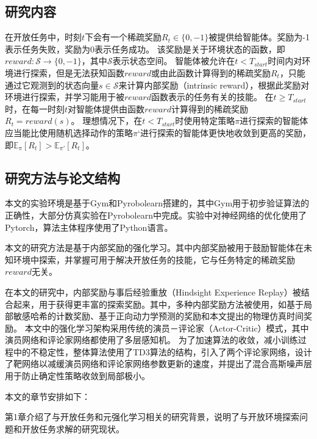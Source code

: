         \subsection{研究内容}
        在开放任务中，时刻$t$下会有一个稀疏奖励$R_t\in\{0,-1\}$被提供给智能体。奖励为-1表示任务失败，奖励为0表示任务成功。
        该奖励是关于环境状态的函数，即$reward:\mathcal S\to\{0,-1\}$，其中$\mathcal S$表示状态空间。
        智能体被允许在$t< T_{start}$时间内对环境进行探索，但是无法获知函数$reward$或由此函数计算得到的稀疏奖励$R_t$，只能通过它观测到的状态向量$s\in\mathcal S$来计算内部奖励（intrinsic reward），根据此奖励对环境进行探索，并学习能用于被$reward$函数表示的任务有关的技能。
        在$t\geq T_{start}$时，在每一时刻$t$对智能体提供由函数$reward$计算得到的稀疏奖励$R_t=reward(s)$。
        理想情况下，在$t<T_{start}$时使用特定策略$\pi$进行探索的智能体应当能比使用随机选择动作的策略$\pi‘$进行探索的智能体更快地收敛到更高的奖励，即$\mathbb E_\pi[R_t]>\mathbb E_{\pi'}[R_t]$。

        \subsection{研究方法与论文结构}
        本文的实验环境是基于Gym\cite{brockman2016openai}和Pyrobolearn\cite{delhaisse2019pyrobolearn}搭建的，其中Gym用于初步验证算法的正确性，大部分仿真实验在Pyrobolearn中完成。实验中对神经网络的优化使用了Pytorch\cite{paszke2019pytorch}，算法主体程序使用了Python语言。

        本文的研究方法是基于内部奖励的强化学习。其中内部奖励被用于鼓励智能体在未知环境中探索，并掌握可用于解决开放任务的技能，它与任务特定的稀疏奖励$reward$无关。

        在本文的研究中，内部奖励与事后经验重放（Hindsight Experience Replay）被结合起来，用于获得更丰富的探索奖励。其中，多种内部奖励方法被使用，如基于局部敏感哈希的计数奖励、基于正向动力学预测的奖励和本文提出的物理仿真时间奖励。
        本文中的强化学习架构采用传统的演员－评论家（Actor-Critic）模式\cite{konda2002actor}，其中演员网络和评论家网络都使用了多层感知机。
        为了加速算法的收敛，减小训练过程中的不稳定性，整体算法使用了TD3算法\cite{DBLP:journals/corr/abs-1802-09477}的结构，引入了两个评论家网络，设计了靶网络以减缓演员网络和评论家网络参数更新的速度，并提出了混合高斯噪声层用于防止确定性策略收敛到局部极小。

        本文的章节安排如下：

        第1章介绍了与开放任务和元强化学习相关的研究背景，说明了与开放环境探索问题和开放任务求解的研究现状。


